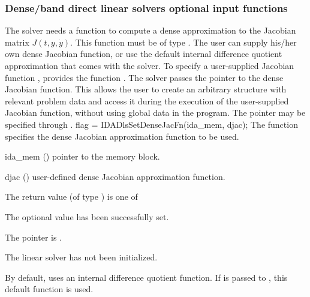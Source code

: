 {\subsubsection{Dense/band direct linear solvers optional input functions}
\label{sss:optin_dls}
The 
{\idadense} solver needs a function to compute a dense approximation to
the Jacobian matrix $J(t,y,\dot{y})$.  
This function must be of type . 
The user can supply his/her own dense Jacobian function, or use the default 
internal difference quotient approximation
that comes with the {\idadense} solver.
To specify a user-supplied Jacobian function , {\idadense} provides 
the function .
The {\idadense} solver passes the pointer  
to the dense Jacobian function. This allows the user to
create an arbitrary structure with relevant problem data and access it
during the execution of the user-supplied Jacobian function, without
using global data in the program. 
The pointer  may be specified through .
{
  flag = IDADlsSetDenseJacFn(ida\_mem, djac);
}
{
  The function  specifies the dense Jacobian
  approximation function to be used.
}
{
  \begin{args}
  \item[ida\_mem] ()
    pointer to the {\ida} memory block.
  \item[djac] ()
    user-defined dense Jacobian approximation function.
  \end{args}
}
{
  The return value  (of type ) is one of
  \begin{args}
  \item[\Id{IDADLS\_SUCCESS}] 
    The optional value has been successfully set.
  \item[\Id{IDADLS\_MEM\_NULL}]
    The  pointer is .
  \item[\Id{IDADLS\_LMEM\_NULL}]
    The {\idadense} linear solver has not been initialized.
  \end{args}
}
{
  By default, {\idadense} uses an internal difference quotient function.
  If  is passed to , this default function is used.

}}
